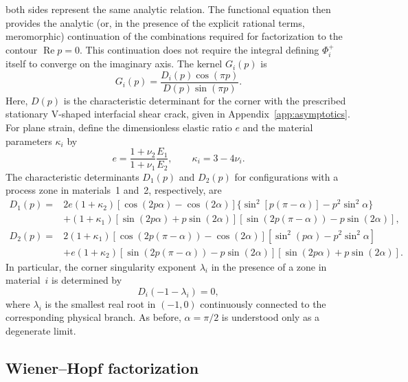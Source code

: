 \documentclass[pdflatex,onecolumn,sn-mathphys-ay]{sn-jnl}
\begin{document}
both sides represent the same analytic relation. The functional equation then provides the analytic (or, in the presence of
the explicit rational terms, meromorphic) continuation of the combinations
required for factorization to the contour $\operatorname{Re}p=0$. This
continuation does not require the integral defining $\Phi_i^+$ itself to
converge on the imaginary axis. The
kernel $G_i(p)$ is
\begin{equation*}
  G_i(p)=\frac{D_i(p)\cos(\pi p)}{D(p)\sin(\pi p)}.
\end{equation*}
Here, $D(p)$ is the characteristic determinant for the corner with the
prescribed stationary V-shaped interfacial shear crack, given in
Appendix~\ref{app:asymptotics}.
For plane strain, define the dimensionless elastic ratio $e$ and the
material parameters $\kappa_i$ by
\begin{equation*}
  e=\frac{1+\nu_2}{1+\nu_1}\frac{E_1}{E_2},
  \qquad
  \kappa_i=3-4\nu_i.
\end{equation*}
The characteristic determinants $D_1(p)$ and $D_2(p)$ for configurations
with a process zone in materials~1 and~2, respectively, are
\begin{equation*}
\begin{aligned}
  D_1(p)={}&2e(1+\kappa_2)
    [\cos(2p\alpha)-\cos(2\alpha)]
    \{\sin^2[p(\pi-\alpha)]-p^2\sin^2\alpha\}\\
  &+(1+\kappa_1)
    [\sin(2p\alpha)+p\sin(2\alpha)]
    [\sin(2p(\pi-\alpha))-p\sin(2\alpha)],\\[2pt]
  D_2(p)={}&2(1+\kappa_1)
    [\cos(2p(\pi-\alpha))-\cos(2\alpha)]
    [\sin^2(p\alpha)-p^2\sin^2\alpha]\\
  &+e(1+\kappa_2)
    [\sin(2p(\pi-\alpha))-p\sin(2\alpha)]
    [\sin(2p\alpha)+p\sin(2\alpha)].
\end{aligned}
\end{equation*}
In particular, the corner singularity exponent $\lambda_i$ in the
presence of a zone in material~$i$ is determined by
\begin{equation*}
  D_i(-1-\lambda_i)=0,
\end{equation*}
where $\lambda_i$ is the smallest real root in $(-1,0)$ continuously
connected to the corresponding physical branch. As before,
$\alpha=\pi/2$ is understood only as a degenerate limit.

\subsection{Wiener--Hopf factorization}
\label{subsec:wiener-hopf}
\end{document}
